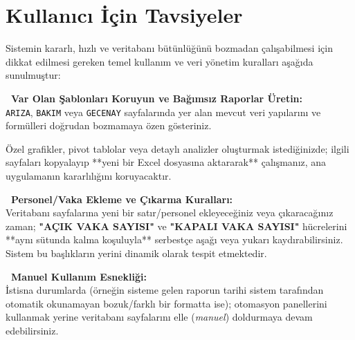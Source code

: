 \chapter{Kullanıcı İçin Tavsiyeler}

Sistemin kararlı, hızlı ve veritabanı bütünlüğünü bozmadan çalışabilmesi için dikkat edilmesi gereken temel kullanım ve veri yönetim kuralları aşağıda sunulmuştur:

\vspace{0.3cm}

\begin{tcolorbox}[colback=lightgray,colframe=bordergray,leftrule=3.5pt,boxrule=0.4pt,top=6pt,bottom=6pt]
    \textbf{\textcolor{primary}{\faDatabase\ Var Olan Şablonları Koruyun ve Bağımsız Raporlar Üretin:}}\\
    \small \texttt{ARIZA}, \texttt{BAKIM} veya \texttt{GECENAY} sayfalarında yer alan mevcut veri yapılarını ve formülleri doğrudan bozmamaya özen gösteriniz. 
    
    Özel grafikler, pivot tablolar veya detaylı analizler oluşturmak istediğinizde; ilgili sayfaları kopyalayıp **yeni bir Excel dosyasına aktararak** çalışmanız, ana uygulamanın kararlılığını koruyacaktır.
\end{tcolorbox}

\vspace{0.2cm}

\begin{tcolorbox}[colback=lightgray,colframe=bordergray,leftrule=3.5pt,boxrule=0.4pt,top=6pt,bottom=6pt]
    \textbf{\textcolor{primary}{\faArrowsAltV\ Personel/Vaka Ekleme ve Çıkarma Kuralları:}}\\
    \small Veritabanı sayfalarına yeni bir satır/personel ekleyeceğiniz veya çıkaracağınız zaman; \textbf{"AÇIK VAKA SAYISI"} ve \textbf{"KAPALI VAKA SAYISI"} hücrelerini **aynı sütunda kalma koşuluyla** serbestçe aşağı veya yukarı kaydırabilirsiniz. Sistem bu başlıkların yerini dinamik olarak tespit etmektedir.
\end{tcolorbox}

\vspace{0.2cm}

\begin{tcolorbox}[colback=lightgray,colframe=bordergray,leftrule=3.5pt,boxrule=0.4pt,top=6pt,bottom=6pt]
    \textbf{\textcolor{primary}{\faHandPaper\ Manuel Kullanım Esnekliği:}}\\
    \small İstisna durumlarda (örneğin sisteme gelen raporun tarihi sistem tarafından otomatik okunamayan bozuk/farklı bir formatta ise); otomasyon panellerini kullanmak yerine veritabanı sayfalarını elle (\textit{manuel}) doldurmaya devam edebilirsiniz.
\end{tcolorbox}

